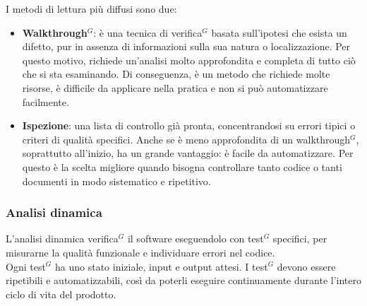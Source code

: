 I metodi di lettura più diffusi sono due:
\begin{itemize}[itemsep=3pt, parsep=1pt, label=$\scriptstyle\bullet$]
    \item \textbf{Walkthrough$^G$}: è una tecnica di verifica$^G$ basata sull'ipotesi che esista un difetto, pur in assenza di informazioni sulla sua natura o localizzazione. Per questo motivo, richiede un'analisi molto approfondita e completa di tutto ciò che si sta esaminando. Di conseguenza, è un metodo che richiede molte risorse, è difficile da applicare nella pratica e non si può automatizzare facilmente.
    \item \textbf{Ispezione}: una lista di controllo già pronta, concentrandosi su errori tipici o criteri di qualità specifici. Anche se è meno approfondita di un walkthrough$^G$, soprattutto all'inizio, ha un grande vantaggio: è facile da automatizzare. Per questo è la scelta migliore quando bisogna controllare tanto codice o tanti documenti in modo sistematico e ripetitivo.
\end{itemize}

\subsubsection{Analisi dinamica}
L'analisi dinamica verifica$^G$ il software eseguendolo con test$^G$ specifici, per misurarne la qualità funzionale e individuare errori nel codice.\\
Ogni test$^G$ ha uno stato iniziale, input e output attesi. I test$^G$ devono essere ripetibili e automatizzabili, così da poterli eseguire continuamente durante l'intero ciclo di vita del prodotto.

